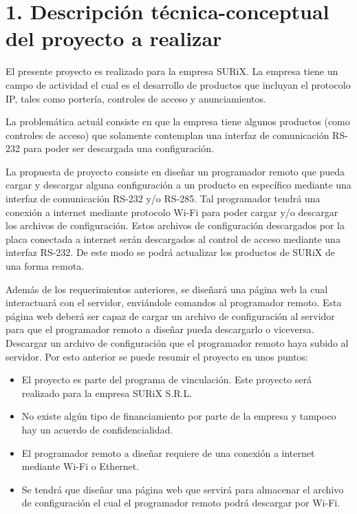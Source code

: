 \documentclass[
11pt, %
]{charter}
\begin{document}
\section{1. Descripción técnica-conceptual del proyecto a realizar}
\label{sec:descripcion}



El presente proyecto es realizado para la empresa SURiX. La empresa tiene un campo de actividad el cual es el desarrollo de productos que incluyan el protocolo IP, tales como portería, controles de acceso y anunciamientos.

La problemática actuál consiste en que la empresa tiene algunos productos (como controles de acceso) que solamente contemplan una interfaz de comunicación RS-232 para poder ser descargada una configuración.

La propuesta de proyecto consiste en diseñar un programador remoto que pueda cargar y descargar alguna configuración a un producto en específico mediante una interfaz de comunicación RS-232 y/o RS-285. Tal programador tendrá una conexión a internet mediante protocolo Wi-Fi para poder cargar y/o descargar los archivos de configuración. Estos archivos de configuración descargados por la placa conectada a internet serán descargados al control de acceso mediante una interfaz RS-232. De este modo se podrá actualizar los productos de SURiX de una forma remota. 

Además de los requerimientos anteriores, se diseñará una página web la cual interactuará con el servidor, enviándole comandos al programador remoto. Esta página web deberá ser capaz de cargar un archivo de configuración al servidor para que el programador remoto a diseñar pueda descargarlo o viceversa. Descargar un archivo de configuración que el programador remoto haya subido al servidor.
Por esto anterior se puede resumir el proyecto en unos puntos:

\begin{itemize}
	\item El proyecto es parte del programa de vinculación. Este proyecto será realizado para la empresa SURiX S.R.L.
	\item No existe algún tipo de financiamiento por parte de la empresa y tampoco hay un acuerdo de confidencialidad.
	\item El programador remoto a diseñar requiere de una conexión a internet mediante Wi-Fi o Ethernet.
	\item Se tendrá que diseñar una página web que servirá para almacenar el archivo de configuración el cual el programador remoto podrá descargar por Wi-Fi.
\end{itemize}
\end{document}
